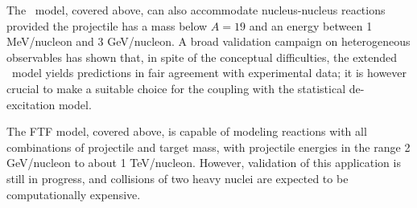 The \inclxx\ model, covered above, can also accommodate nucleus-nucleus 
reactions provided the projectile has a mass below $A = 19$ and an energy 
between 1 MeV/nucleon and 3 GeV/nucleon.  A broad validation campaign on 
heterogeneous observables has shown that, in spite of the conceptual 
difficulties, the extended \inclxx\ model yields predictions in fair agreement 
with experimental data; it is however crucial to make a suitable choice for the 
coupling with the statistical de-excitation model.

The FTF model, covered above, is capable of modeling 
reactions with all combinations of projectile and target mass, with projectile 
energies in the range 2 GeV/nucleon to about 1 TeV/nucleon.  However, validation
of this application is still in progress, and collisions of two heavy nuclei are 
expected to be computationally expensive.

